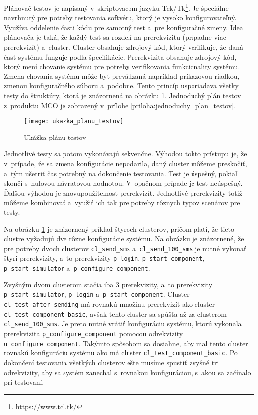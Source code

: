 Plánovač testov je napísaný v~skriptovacom jazyku Tck/Tk\footnote{https://www.tcl.tk/}. 
Je špeciálne navrhnutý pre potreby testovania softvéru, ktorý je vysoko 
konfigurovateľný. Využíva oddelenie časti kódu pre samotný test
a~pre konfiguračné zmeny. Idea plánovača je taká, že každý test sa 
rozdelí na prerekvizitu (prípadne viac prerekvizít) a~cluster. Cluster 
obsahuje zdrojový kód, ktorý verifikuje, že daná časť systému funguje 
podľa špecifikácie. Prerekvizita obsahuje zdrojový kód, ktorý mení 
chovanie systému pre potreby verifikovania funkcionality systému.
Zmena chovania systému môže byť prevádzaná napríklad príkazovou riadkou, 
zmenou konfiguračného súboru a~podobne.
Tento princíp usporiadava všetky testy do štruktúry, ktorá je znázornená 
na obrázku \ref{obrazok:ukazka_planu_testov}. Jednoduchý plán testov
z~produktu MCO je zobrazený v~prílohe \ref{priloha:jednoduchy_plan_testov}.

\begin{figure}[h]
  \begin{center}
    \texttt{[image: ukazka\_planu\_testov]}
    \caption{Ukážka plánu testov}
    \label{obrazok:ukazka_planu_testov}
  \end{center}
\end{figure}

Jednotlivé testy sa potom vykonávajú sekvenčne. Výhodou tohto prístupu 
je, že v~prípade, že sa zmena konfigurácie nepodarila, daný cluster 
môžeme preskočiť, a~tým ušetriť čas potrebný na dokončenie testovania. 
Test je úspešný, pokiaľ skončí s~nulovou návratovou hodnotou. 
V~opačnom prípade je test neúspešný.  
Ďalšou výhodou je znovupoužiteľnosť prerekvizít. 
Jednotlivé prerekvizity totiž môžeme kombinovať a~využiť ich tak pre 
potreby rôznych typov scenárov pre testy. 

Na obrázku \ref{obrazok:ukazka_planu_testov} je znázornený príklad štyroch 
clusterov, pričom platí, že tieto clustre vyžadujú dve rôzne konfigurácie
systému. 
Na obrázku je znázornené, že pre potreby dvoch clusterov \texttt{cl\_send\_sms}
a~\texttt{cl\_send\_100\_sms} je nutné vykonať štyri prerekvizity, a~to 
prerekvizity \texttt{p\_login}, \texttt{p\_start\_component}, 
\texttt{p\_start\_simulator} a~\texttt{p\_configure\_component}. 

Zvyšným dvom clusterom stačia iba 3 prerekvizity, a~to prerekvizity
\texttt{p\_start\_simulator}, \texttt{p\_login} 
a~\texttt{p\_start\_component}. Cluster \texttt{cl\_test\_after\_sending} 
má rovnakú množinu prerekvizít ako cluster \texttt{cl\_test\_component\_basic}, 
avšak tento cluster sa spúšťa až za clusterom \texttt{cl\_send\_100\_sms}. 
Je preto nutné vrátiť konfiguráciu systému, ktorú vykonala prerekvizita 
\texttt{p\_configure\_component} pomocou odrekvizity
\texttt{u\_configure\_component}. 
Takýmto spôsobom sa dosiahne, aby mal tento cluster rovnakú konfiguráciu 
systému ako má cluster \texttt{cl\_test\_component\_basic}.
Po dokončení testovania všetkých clusterov ešte musíme spustiť zvyšné tri
odrekvizity, aby sa systém zanechal s~rovnakou konfiguráciou, s~akou 
sa začínalo pri testovaní.

